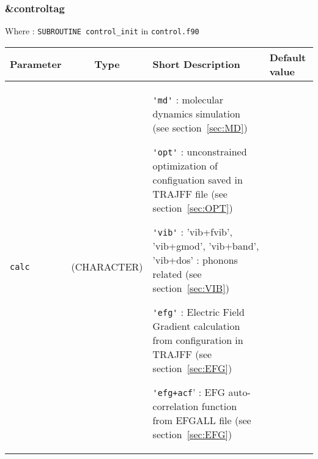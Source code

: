 \documentclass[a4paper,8pt]{article}
\begin{document}
\subsubsection{\&controltag }

Where : \verb?SUBROUTINE control_init? in \verb?control.f90?
\newline

\begin{longtable}{l|c|m{8cm}|m{2cm}}
\hline
\hline
Parameter        &  Type              &          Short Description                                                          & Default value \\
\hline
\hline
\rule[-2.5cm]{0cm}{5cm}
\verb?calc?      & (CHARACTER)        & \newline \verb?'md'?  : molecular dynamics simulation (see section~\ref{sec:MD}) \newline

                                        \verb?'opt'? : unconstrained optimization of configuation saved in TRAJFF file 
					(see section~\ref{sec:OPT}) \newline

					\verb?'vib'? : 'vib+fvib', 'vib+gmod', 'vib+band', 'vib+dos' : phonons related 
					(see section~\ref{sec:VIB})\newline

					\verb?'efg'? : Electric Field Gradient calculation from configuration in TRAJFF 
					(see section~\ref{sec:EFG})\newline

					\verb?'efg+acf?' : EFG auto-correlation function from EFGALL file 
					(see section~\ref{sec:EFG})\newline


\end{longtable}
\end{document}
